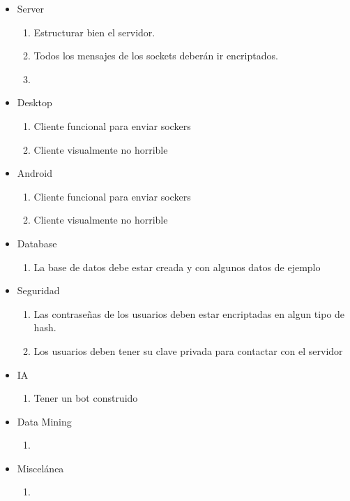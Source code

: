 \documentclass{article}
\theoremstyle{definition}
\begin{document}
\begin{itemize}
\item Server \begin{enumerate}
\item Estructurar bien el servidor.
\item Todos los mensajes de los sockets deberán ir encriptados.
\item 
\end{enumerate}
\item Desktop \begin{enumerate}
\item Cliente funcional para enviar sockers
\item Cliente visualmente no horrible
\end{enumerate}
\item Android \begin{enumerate}
\item Cliente funcional para enviar sockers
\item Cliente visualmente no horrible
\end{enumerate}
\item Database \begin{enumerate}
\item La base de datos debe estar creada y con algunos datos de ejemplo
\end{enumerate}
\item Seguridad \begin{enumerate}
\item Las contraseñas de los usuarios deben estar encriptadas en algun tipo de hash.
\item Los usuarios deben tener su clave privada para contactar con el servidor
\end{enumerate}
\item IA \begin{enumerate}
\item Tener un bot construido
\end{enumerate}
\item Data Mining \begin{enumerate}
\item
\end{enumerate}
\item Miscelánea \begin{enumerate}
\item 
\end{enumerate}

\end{itemize}
\end{document}
